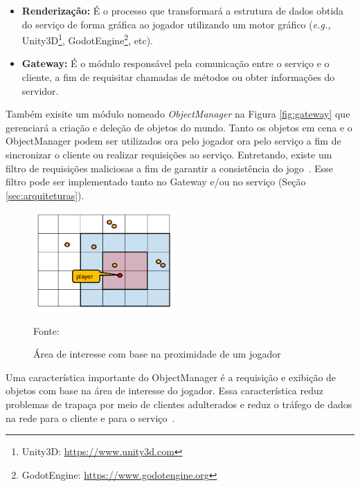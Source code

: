 \begin{itemize}
  \item \textbf{Renderização:} É o processo que transformará a estrutura de dados obtida do serviço de forma gráfica ao jogador utilizando um motor gráfico (\textit{e.g.,} Unity3D\footnote{Unity3D: \url{https://www.unity3d.com}}, GodotEngine\footnote{GodotEngine: \url{https://www.godotengine.org}}, etc).
  \item \textbf{Gateway:} É o módulo responsável pela comunicação entre o serviço e o cliente, a fim de requisitar chamadas de métodos ou obter informações do servidor.
\end{itemize}



Também exisite um módulo nomeado \textit{ObjectManager} na Figura \ref{fig:gateway} que gerenciará a criação e deleção de objetos do mundo.
%
Tanto os objetos em cena e o ObjectManager podem ser utilizados ora pelo jogador ora pelo serviço a fim de sincronizar o cliente ou realizar requisições ao serviço.
%
Entretando, existe um filtro de requisições maliciosas a fim de garantir a consistência do jogo~\cite{albion_online_unite}.
%
Esse filtro pode ser implementado tanto no Gateway e/ou no serviço (Seção \ref{sec:arquiteturas}).



\begin{figure}[htb!]
\caption{Área de interesse com base na proximidade de um jogador}
\label{fig:proximidade}
\includegraphics[height=3.8cm]{img/cap2/proximidade.png}
\centering

Fonte:~\cite{albion_online_unite}
\end{figure}



Uma característica importante do ObjectManager é a requisição e exibição de objetos com base na área de interesse do jogador.
%
Essa característica reduz problemas de trapaça por meio de clientes adulterados e reduz o tráfego de dados na rede para o cliente e para o serviço~\cite{albion_online_unite, stephenclarkewillson2017}.



